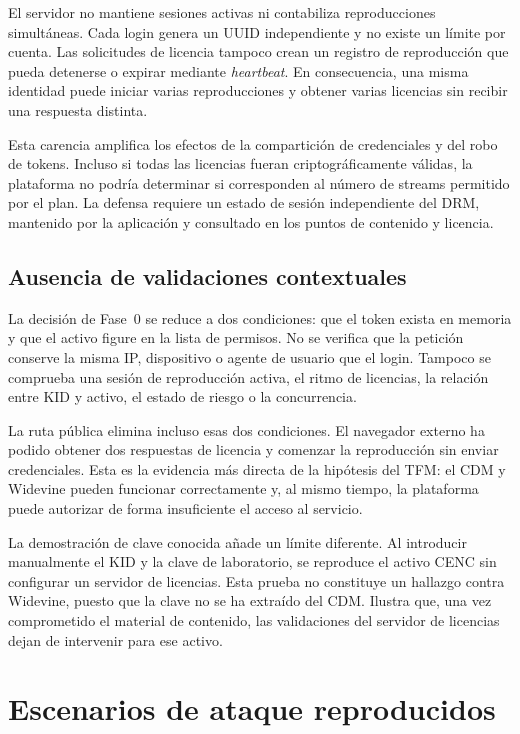 El servidor no mantiene sesiones activas ni contabiliza reproducciones simultáneas. Cada login genera un UUID independiente y no existe un límite por cuenta. Las solicitudes de licencia tampoco crean un registro de reproducción que pueda detenerse o expirar mediante \textit{heartbeat}. En consecuencia, una misma identidad puede iniciar varias reproducciones y obtener varias licencias sin recibir una respuesta distinta.

Esta carencia amplifica los efectos de la compartición de credenciales y del robo de tokens. Incluso si todas las licencias fueran criptográficamente válidas, la plataforma no podría determinar si corresponden al número de streams permitido por el plan. La defensa requiere un estado de sesión independiente del DRM, mantenido por la aplicación y consultado en los puntos de contenido y licencia.

\subsection{Ausencia de validaciones contextuales}

La decisión de Fase~0 se reduce a dos condiciones: que el token exista en memoria y que el activo figure en la lista de permisos. No se verifica que la petición conserve la misma IP, dispositivo o agente de usuario que el login. Tampoco se comprueba una sesión de reproducción activa, el ritmo de licencias, la relación entre KID y activo, el estado de riesgo o la concurrencia.

La ruta pública elimina incluso esas dos condiciones. El navegador externo ha podido obtener dos respuestas de licencia y comenzar la reproducción sin enviar credenciales. Esta es la evidencia más directa de la hipótesis del TFM: el CDM y Widevine pueden funcionar correctamente y, al mismo tiempo, la plataforma puede autorizar de forma insuficiente el acceso al servicio.

La demostración de clave conocida añade un límite diferente. Al introducir manualmente el KID y la clave de laboratorio, se reproduce el activo CENC sin configurar un servidor de licencias. Esta prueba no constituye un hallazgo contra Widevine, puesto que la clave no se ha extraído del CDM. Ilustra que, una vez comprometido el material de contenido, las validaciones del servidor de licencias dejan de intervenir para ese activo.

\section{Escenarios de ataque reproducidos}

